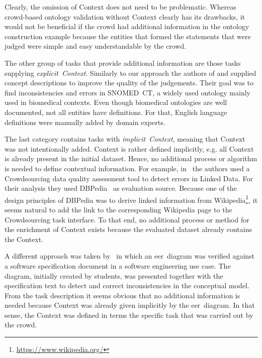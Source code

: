 Clearly, the omission of Context does not need to be problematic. Whereas crowd-based ontology validation without Context clearly has its drawbacks, it would not be beneficial if the crowd had additional information in the ontology construction example because the entities that formed the statements that were judged were simple and easy understandable by the crowd. 

The other group of tasks that provide additional information are those tasks supplying \emph{explicit~Context}. Similarly to our approach the authors of \cite{mortensen2015} and \cite{mortensen2016} supplied concept descriptions to improve the quality of the judgements. Their goal was to find inconsistencies and errors in SNOMED~CT, a widely used ontology mainly used in biomedical contexts. Even though biomedical ontologies are well documented, not all entities have definitions. For that, English language definitions were manually added by domain experts. 

The last category contains tasks with \emph{implicit~Context}, meaning that Context was not intentionally added. Context is rather defined implicitly, e.g. all Context is already present in the initial dataset. Hence, no additional process or algorithm is needed to define contextual information. For example, in~\cite{acosta2018} the authors used a Crowdsourcing data quality assessment tool to detect errors in Linked Data. 
For their analysis they used DBPedia~\cite{auer2007} as evaluation source. Because one of the design principles of DBPedia was to derive linked information from Wikipedia\footnote{\url{https://www.wikipedia.org/}}, it seems natural to add the link to the corresponding Wikipedia page to the Crowdsourcing task interface. To that end, no additional process or method for the enrichment of Context exists because the evaluated dataset already contains the Context.

A different approach was taken by~\cite{sabou2018, winkler2017, winkler2017_2} in which an \gls{eer}~diagram was verified against a software specification document in a software engineering use case. The diagram, initially created by students, was presented together with the specification text to detect and correct inconsistencies in the conceptual model. From the task description it seems obvious that no additional information is needed because Context was already given implicitly by the \gls{eer}~diagram. In that sense, the Context was defined in terms the specific task that was carried out by the crowd. 

